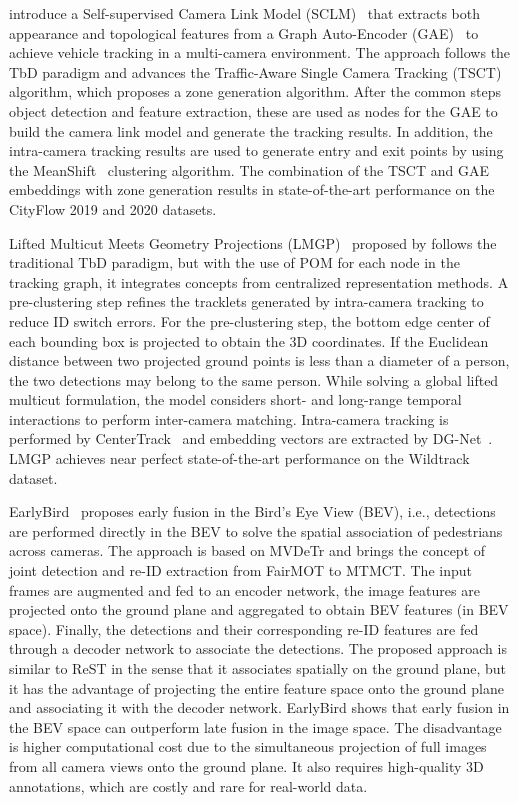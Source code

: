 \citeauthor{Hsu22} introduce a Self-supervised Camera Link Model (SCLM)~\cite{Hsu22} that extracts both appearance and topological features from a Graph Auto-Encoder (GAE)~\cite{Kipf16} to achieve vehicle tracking in a multi-camera environment. The approach follows the TbD paradigm and advances the Traffic-Aware Single Camera Tracking (TSCT)~\cite{Hsu20} algorithm, which proposes a zone generation algorithm. After the common steps object detection and feature extraction, these are used as nodes for the GAE to build the camera link model and generate the tracking results. In addition, the intra-camera tracking results are used to generate entry and exit points by using the MeanShift~\cite{Comaniciu02} clustering algorithm. The combination of the TSCT and GAE embeddings with zone generation results in state-of-the-art performance on the CityFlow 2019 and 2020 datasets.

Lifted Multicut Meets Geometry Projections (LMGP)~\cite{Nguyen22a} proposed by \citeauthor{Nguyen22a} follows the traditional TbD paradigm, but with the use of POM for each node in the tracking graph, it integrates concepts from centralized representation methods. A pre-clustering step refines the tracklets generated by intra-camera tracking to reduce ID switch errors. For the pre-clustering step, the bottom edge center of each bounding box is projected to obtain the 3D coordinates. If the Euclidean distance between two projected ground points is less than a diameter of a person, the two detections may belong to the same person. While solving a global lifted multicut formulation, the model considers short- and long-range temporal interactions  to perform inter-camera matching. Intra-camera tracking is performed by CenterTrack~\cite{Zhou20} and embedding vectors are extracted by DG-Net~\cite{Zheng19}. LMGP achieves near perfect state-of-the-art performance on the Wildtrack dataset.

EarlyBird~\cite{Teepe23} proposes early fusion in the Bird's Eye View (BEV), i.e., detections are performed directly in the BEV to solve the spatial association of pedestrians across cameras. The approach is based on MVDeTr and brings the concept of joint detection and re-ID extraction from FairMOT to MTMCT. The input frames are augmented and fed to an encoder network, the image features are projected onto the ground plane and aggregated to obtain BEV features (in BEV space). Finally, the detections and their corresponding re-ID features are fed through a decoder network to associate the detections. The proposed approach is similar to ReST in the sense that it associates spatially on the ground plane, but it has the advantage of projecting the entire feature space onto the ground plane and associating it with the decoder network. EarlyBird shows that early fusion in the BEV space can outperform late fusion in the image space. The disadvantage is higher computational cost due to the simultaneous projection of full images from all camera views onto the ground plane. It also requires high-quality 3D annotations, which are costly and rare for real-world data.

